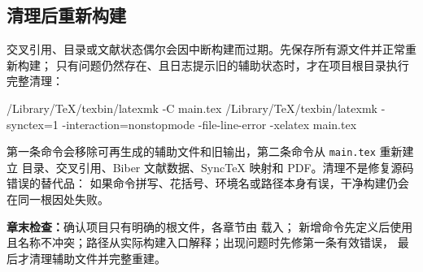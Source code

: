 \subsection{清理后重新构建}

交叉引用、目录或文献状态偶尔会因中断构建而过期。先保存所有源文件并正常重新构建；
只有问题仍然存在、且日志提示旧的辅助状态时，才在项目根目录执行完整清理：

\begin{codeblock}
/Library/TeX/texbin/latexmk -C main.tex
/Library/TeX/texbin/latexmk -synctex=1 -interaction=nonstopmode -file-line-error -xelatex main.tex
\end{codeblock}

第一条命令会移除可再生成的辅助文件和旧输出，第二条命令从 \texttt{main.tex} 重新建立
目录、交叉引用、Biber 文献数据、SyncTeX 映射和 PDF。清理不是修复源码错误的替代品：
如果命令拼写、花括号、环境名或路径本身有误，干净构建仍会在同一根因处失败。

\begin{resultbox}
\textbf{章末检查：}确认项目只有明确的根文件，各章节由 \verb|| 载入；
新增命令先定义后使用且名称不冲突；路径从实际构建入口解释；出现问题时先修第一条有效错误，
最后才清理辅助文件并完整重建。
\end{resultbox}
